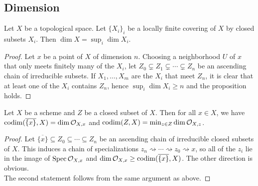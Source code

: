 \subsection{Dimension}

\begin{exer}
	Let $X$ be a topological space. Let $\{X_i\}_i$ be a locally finite
	covering of $X$ by closed subsets $X_i$. Then $\dim X = \sup_i \dim
	X_i$.
\end{exer}
\begin{proof}
	Let $x$ be a point of $X$ of dimension $n$. Choosing a neighborhood $U$
	of $x$ that only meets finitely many of the $X_i$, let $Z_0 \subsetneq
	Z_1 \subsetneq \cdots \subsetneq Z_n$ be an ascending chain of
	irreducible subsets. If $X_1,\ldots,X_m$ are the $X_i$ that meet $Z_n$,
	it is clear that at least one of the $X_i$ contains $Z_n$, hence
	$\sup_i \dim X_i \geq n$ and the proposition holds.
\end{proof}

\begin{exer}
	Let $X$ be a scheme and $Z$ be a closed subset of $X$. Then for all $x
	\in X$, we have $\operatorname{codim}(\overline{\{x\}}, X) = \dim \mathcal{O}_{X,x}$ and
	$\operatorname{codim}(Z,X) = \min_{z \in Z} \dim \mathcal{O}_{X,z}$.
\end{exer}
\begin{proof}
	Let $\overline{\{x\}} \subseteq Z_0 \subseteq \cdots \subseteq Z_n$ be
	an ascending chain of irreducible closed subsets of $X$. This induces a
	chain of specializations $z_n \rightsquigarrow \cdots \rightsquigarrow
	z_0 \rightsquigarrow x$, so all of the $z_i$ lie in the image of
	$\operatorname{Spec} \mathcal{O}_{X,x}$ and $\dim \mathcal{O}_{X,x} \geq \operatorname{codim}(\overline{\{x\}},X)$.
	The other direction is obvious.\\

	The second statement follows from the same argument as above.
\end{proof}

